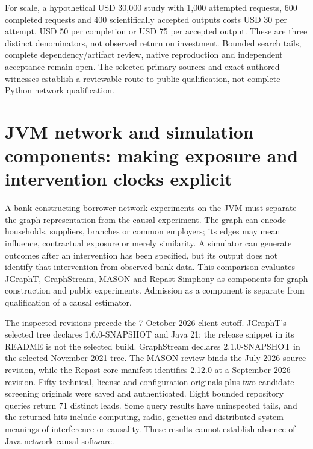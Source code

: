 For scale, a hypothetical USD 30,000 study with 1,000 attempted requests, 600 completed requests and 400 scientifically accepted outputs costs USD 30 per attempt, USD 50 per completion or USD 75 per accepted output. These are three distinct denominators, not observed return on investment. Bounded search tails, complete dependency/artifact review, native reproduction and independent acceptance remain open. The selected primary sources and exact authored witnesses establish a reviewable route to public qualification, not complete Python network qualification.~\citep{exec25_pnet_choice}


\section[JVM network contracts]{JVM network and simulation components: making exposure and intervention clocks explicit}
\label{sec:exec25-java-network}

A bank constructing borrower-network experiments on the JVM must separate the graph representation from the causal experiment. The graph can encode households, suppliers, branches or common employers; its edges may mean influence, contractual exposure or merely similarity. A simulator can generate outcomes after an intervention has been specified, but its output does not identify that intervention from observed bank data. This comparison evaluates JGraphT, GraphStream, MASON and Repast Simphony as components for graph construction and public experiments. Admission as a component is separate from qualification of a causal estimator.~\citep{exec25_jnet_jgrapht,exec25_jnet_graphstream,exec25_jnet_mason,exec25_jnet_repast}

The inspected revisions precede the 7 October 2026 client cutoff. JGraphT's selected tree declares 1.6.0-SNAPSHOT and Java 21; the release snippet in its README is not the selected build. GraphStream declares 2.1.0-SNAPSHOT in the selected November 2021 tree. The MASON review binds the July 2026 source revision, while the Repast core manifest identifies 2.12.0 at a September 2026 revision. Fifty technical, license and configuration originals plus two candidate-screening originals were saved and authenticated. Eight bounded repository queries return 71 distinct leads. Some query results have uninspected tails, and the returned hits include computing, radio, genetics and distributed-system meanings of interference or causality. These results cannot establish absence of Java network-causal software.~\citep{exec25_jnet_choice}

